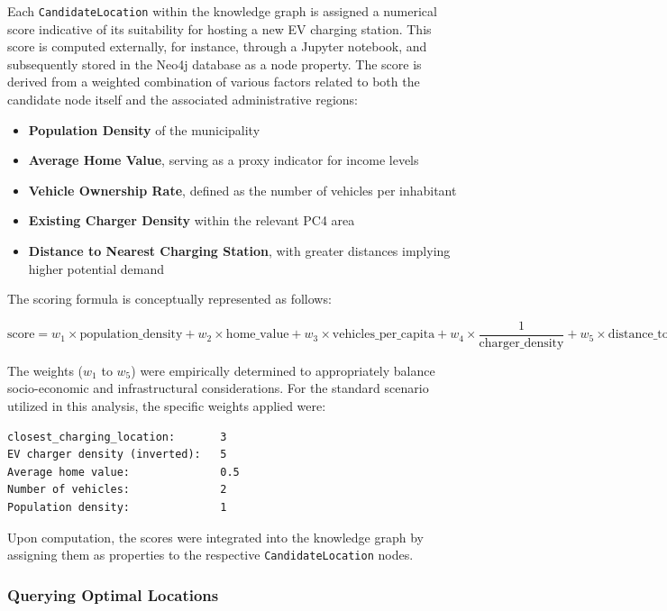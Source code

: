 \documentclass{article}
\begin{document}
Each \texttt{CandidateLocation} within the knowledge graph is assigned a numerical score indicative of its suitability for hosting a new EV charging station. This score is computed externally, for instance, through a Jupyter notebook, and subsequently stored in the Neo4j database as a node property. The score is derived from a weighted combination of various factors related to both the candidate node itself and the associated administrative regions:

\begin{itemize}
	\item \textbf{Population Density} of the municipality
	\item \textbf{Average Home Value}, serving as a proxy indicator for income levels
	\item \textbf{Vehicle Ownership Rate}, defined as the number of vehicles per inhabitant
	\item \textbf{Existing Charger Density} within the relevant PC4 area
	\item \textbf{Distance to Nearest Charging Station}, with greater distances implying higher potential demand
\end{itemize}

The scoring formula is conceptually represented as follows:

\[
	\text{score} = w_1 \times \text{population\_density} + w_2 \times \text{home\_value} + w_3 \times \text{vehicles\_per\_capita}
	+ w_4 \times \frac{1}{\text{charger\_density}} + w_5 \times \text{distance\_to\_nearest}
\]

The weights ($w_1$ to $w_5$) were empirically determined to appropriately balance socio-economic and infrastructural considerations. For the standard scenario utilized in this analysis, the specific weights applied were:

\begin{verbatim}
closest_charging_location:       3
EV charger density (inverted):   5
Average home value:              0.5
Number of vehicles:              2
Population density:              1
\end{verbatim}

Upon computation, the scores were integrated into the knowledge graph by assigning them as properties to the respective \texttt{CandidateLocation} nodes.

\subsubsection{Querying Optimal Locations}
\end{document}
